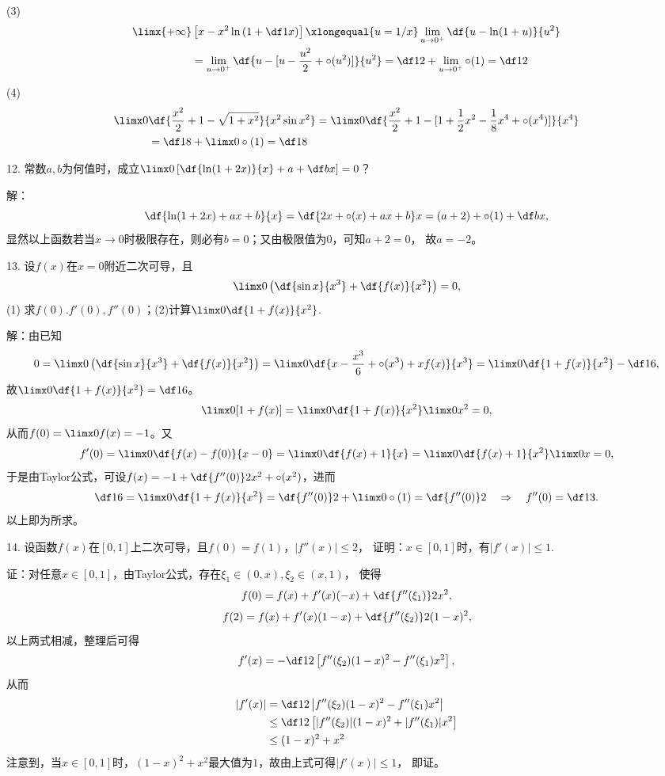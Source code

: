 (3)
\begin{align}
	\limx{+\infty}&\left[x-x^2\ln\left(1+\df1x\right)\right]
	\xlongequal{u=1/x}\lim\limits_{u\to0^+}
	\df{u-\ln(1+u)}{u^2}\notag\\
	&=\lim\limits_{u\to0^+}\df{u-[u-\frac{u^2}2+\circ(u^2)]}{u^2}
	=\df12+\lim\limits_{u\to0^+}\circ(1)=\df12\notag
\end{align}

(4)
\begin{align}
	\limx0&\df{\frac{x^2}2+1-\sqrt{1+x^2}}{x^2\sin x^2}
	=\limx0\df{\frac{x^2}2+1-[1+\frac12x^2-\frac18x^4+\circ(x^4)]}{x^4}\notag\\
	&=\df18+\limx0\circ(1)=\df18\notag
\end{align}

\bigskip

12. 常数$a,b$为何值时，成立$\limx0\left[\df{\ln(1+2x)}{x}+a
+\df bx\right]=0$？

解：
$$\df{\ln(1+2x)+ax+b}{x}=\df{2x+\circ(x)+ax+b}x=(a+2)+\circ(1)+\df bx,$$
显然以上函数若当$x\to0$时极限存在，则必有$b=0$；又由极限值为$0$，可知$a+2=0$，
故$a=-2$。

\bigskip

13. 设$f(x)$在$x=0$附近二次可导，且
$$\limx0\left(\df{\sin x}{x^3}+\df{f(x)}{x^2}\right)=0,$$
(1) 求$f(0).f'(0),f''(0)$；(2)计算$\limx0\df{1+f(x)}{x^2}$.

解：由已知
$$0=\limx0\left(\df{\sin x}{x^3}+\df{f(x)}{x^2}\right)
=\limx0\df{x-\frac{x^3}6+\circ(x^3)+xf(x)}{x^3}
=\limx0\df{1+f(x)}{x^2}-\df16,$$
故$\limx0\df{1+f(x)}{x^2}=\df16$。
$$\limx0[1+f(x)]=\limx0\df{1+f(x)}{x^2}\limx0x^2=0,$$
从而$f(0)=\limx0f(x)=-1$。又
$$f'(0)=\limx0\df{f(x)-f(0)}{x-0}=\limx0\df{f(x)+1}{x}
=\limx0\df{f(x)+1}{x^2}\limx0x=0,$$
于是由Taylor公式，可设$f(x)=-1+\df{f''(0)}2x^2+\circ(x^2)$，进而
$$\df16=\limx0\df{1+f(x)}{x^2}=\df{f''(0)}2+\limx0\circ(1)
=\df{f''(0)}2\quad\Rightarrow\quad f''(0)=\df13.$$
以上即为所求。

\bigskip

14. 设函数$f(x)$在$[0,1]$上二次可导，且$f(0)=f(1)$，$|f''(x)|\leq2$，
证明：$x\in[0,1]$时，有$|f'(x)|\leq 1$.

证：对任意$x\in[0,1]$，由Taylor公式，存在$\xi_1\in(0,x),\xi_2\in(x,1)$，
使得
$$f(0)=f(x)+f'(x)(-x)+\df{f''(\xi_1)}2x^2,$$
$$f(2)=f(x)+f'(x)(1-x)+\df{f''(\xi_2)}2(1-x)^2,$$
以上两式相减，整理后可得
$$f'(x)=-\df12\left[f''(\xi_2)(1-x)^2-f''(\xi_1)x^2\right],$$
从而
\begin{align}
	|f'(x)|&=\df12\left|f''(\xi_2)(1-x)^2-f''(\xi_1)x^2\right|\notag\\
	&\leq\df12\left[|f''(\xi_2)|(1-x)^2+|f''(\xi_1)|x^2\right]\notag\\
	&\leq(1-x)^2+x^2\notag
\end{align}
注意到，当$x\in[0,1]$时，$(1-x)^2+x^2$最大值为$1$，故由上式可得$|f'(x)|\leq1$，
即证。


